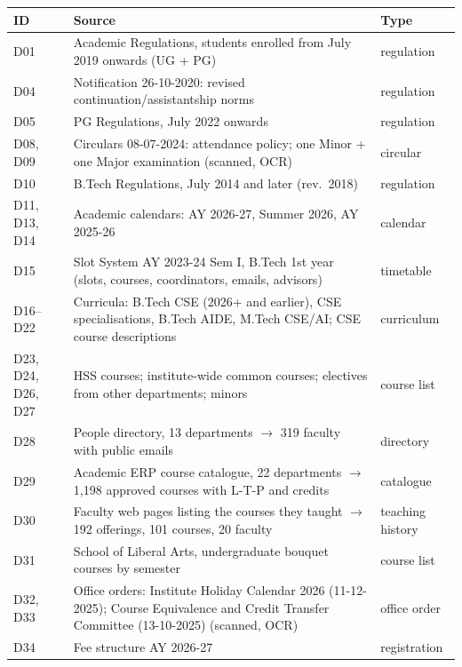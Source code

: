 \documentclass[11pt,a4paper]{article}
\begin{document}
\medskip
\begin{tabularx}{\textwidth}{@{}lYl@{}}
\toprule
ID & Source & Type \\ \midrule
D01 & Academic Regulations, students enrolled from July 2019 onwards (UG + PG) & regulation \\
D04 & Notification 26-10-2020: revised continuation/assistantship norms & regulation \\
D05 & PG Regulations, July 2022 onwards & regulation \\
D08, D09 & Circulars 08-07-2024: attendance policy; one Minor + one Major examination (scanned, OCR) & circular \\
D10 & B.Tech Regulations, July 2014 and later (rev.\ 2018) & regulation \\
D11, D13, D14 & Academic calendars: AY 2026-27, Summer 2026, AY 2025-26 & calendar \\
D15 & Slot System AY 2023-24 Sem I, B.Tech 1st year (slots, courses, coordinators, emails, advisors) & timetable \\
D16--D22 & Curricula: B.Tech CSE (2026+ and earlier), CSE specialisations, B.Tech AIDE, M.Tech CSE/AI; CSE course descriptions & curriculum \\
D23, D24, D26, D27 & HSS courses; institute-wide common courses; electives from other departments; minors & course list \\
D28 & People directory, 13 departments $\rightarrow$ 319 faculty with public emails & directory \\
D29 & Academic ERP course catalogue, 22 departments $\rightarrow$ 1,198 approved courses with L-T-P and credits & catalogue \\
D30 & Faculty web pages listing the courses they taught $\rightarrow$ 192 offerings, 101 courses, 20 faculty & teaching history \\
D31 & School of Liberal Arts, undergraduate bouquet courses by semester & course list \\
D32, D33 & Office orders: Institute Holiday Calendar 2026 (11-12-2025); Course Equivalence and Credit Transfer Committee (13-10-2025) (scanned, OCR) & office order \\
D34 & Fee structure AY 2026-27 & registration \\
\bottomrule
\end{tabularx}
\end{document}
